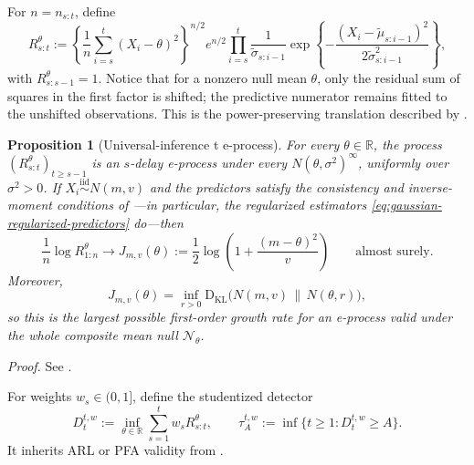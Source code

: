\documentclass[12pt]{article}
\theoremstyle{spaced}
\newtheorem{proposition}[proposition]{Proposition}
\theoremstyle{remark}
\newcommand{\KL}{\mathrm{D}_{\text{KL}}}
\begin{document}
For $n=n_{s:t}$, define
\begin{equation}
\label{eq:UI-t-eprocess}
  R_{s:t}^{\theta}
  :=
  \left\{
    \frac1n\sum_{i=s}^t(X_i-\theta)^2
  \right\}^{n/2}
  e^{n/2}
  \prod_{i=s}^t
  \frac1{\widetilde\sigma_{s:i-1}}
  \exp\left\{
    -\frac{(X_i-\widetilde\mu_{s:i-1})^2}
           {2\widetilde\sigma^2_{s:i-1}}
  \right\},
\end{equation}
with $R_{s:s-1}^{\theta}=1$.  Notice that for a nonzero null mean $\theta$,
only the residual sum of squares in the first factor is shifted; the
predictive numerator remains fitted to the unshifted observations.  This is
the power-preserving translation described by \citet{wang2024anytime}.

\begin{proposition}[Universal-inference t e-process]
\label{prop:UI-t-eprocess}
For every $\theta\in\mathbb R$, the process
$(R_{s:t}^{\theta})_{t\ge s-1}$ is an $s$-delay e-process under every
$N(\theta,\sigma^2)^\infty$, uniformly over $\sigma^2>0$.
If $X_i\stackrel{\mathrm{iid}}\sim N(m,v)$ and the predictors satisfy the
consistency and inverse-moment conditions of \citet[Proposition~3.3]{wang2024anytime}
---in particular, the regularized estimators
\eqref{eq:gaussian-regularized-predictors} do---then
\begin{equation}
\label{eq:UI-t-growth}
  \frac1n\log R_{1:n}^{\theta}
  \longrightarrow
  J_{m,v}(\theta)
  :=\frac12\log\left(1+\frac{(m-\theta)^2}{v}\right)
  \qquad\text{almost surely}.
\end{equation}
Moreover,
\begin{equation}
\label{eq:t-reverse-I-projection}
  J_{m,v}(\theta)
  =\inf_{r>0}
    \KL\bigl(N(m,v)\,\|\,N(\theta,r)\bigr),
\end{equation}
so this is the largest possible first-order growth rate for an e-process
valid under the whole composite mean null $\mathcal N_\theta$.
\end{proposition}
\emph{Proof.} See .




For weights $w_s\in(0,1]$, define the studentized detector
\begin{equation}
\label{eq:t-detector}
  D_t^{t,w}
  :=\inf_{\theta\in\mathbb R}
      \sum_{s=1}^t w_sR_{s:t}^{\theta},
  \qquad
  \tau_A^{t,w}
  :=\inf\{t\ge1:D_t^{t,w}\ge A\}.
\end{equation}
It inherits ARL or PFA validity from
.
\end{document}
